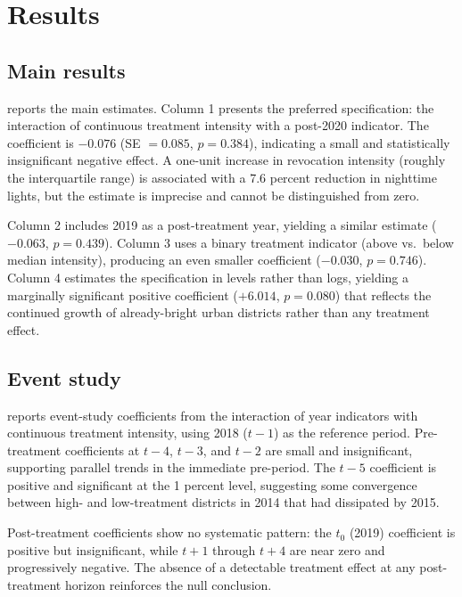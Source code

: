 \documentclass[12pt]{article}
\begin{document}
\section{Results}

\subsection{Main results}

 reports the main estimates. Column 1 presents the preferred specification: the interaction of continuous treatment intensity with a post-2020 indicator. The coefficient is $-0.076$ (SE $= 0.085$, $p = 0.384$), indicating a small and statistically insignificant negative effect. A one-unit increase in revocation intensity (roughly the interquartile range) is associated with a 7.6 percent reduction in nighttime lights, but the estimate is imprecise and cannot be distinguished from zero.

Column 2 includes 2019 as a post-treatment year, yielding a similar estimate ($-0.063$, $p = 0.439$). Column 3 uses a binary treatment indicator (above vs.\ below median intensity), producing an even smaller coefficient ($-0.030$, $p = 0.746$). Column 4 estimates the specification in levels rather than logs, yielding a marginally significant positive coefficient ($+6.014$, $p = 0.080$) that reflects the continued growth of already-bright urban districts rather than any treatment effect.



\subsection{Event study}

 reports event-study coefficients from the interaction of year indicators with continuous treatment intensity, using 2018 ($t-1$) as the reference period. Pre-treatment coefficients at $t-4$, $t-3$, and $t-2$ are small and insignificant, supporting parallel trends in the immediate pre-period. The $t-5$ coefficient is positive and significant at the 1 percent level, suggesting some convergence between high- and low-treatment districts in 2014 that had dissipated by 2015.

Post-treatment coefficients show no systematic pattern: the $t_0$ (2019) coefficient is positive but insignificant, while $t+1$ through $t+4$ are near zero and progressively negative. The absence of a detectable treatment effect at any post-treatment horizon reinforces the null conclusion.
\end{document}
